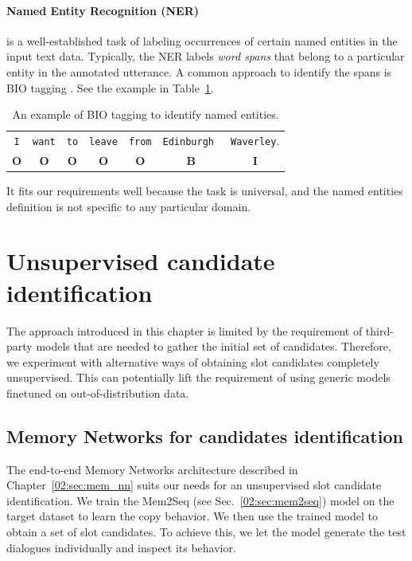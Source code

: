 \paragraph{Named Entity Recognition (NER)} is a well-established task of labeling occurrences of certain named entities in the input text data.
Typically, the NER labels \textit{word spans} that belong to a particular entity in the annotated utterance.
A common approach to identify the spans is BIO tagging \cite{ramshaw-marcus-1995-text}.
See the example in Table~\ref{04:tab:ner_example}.
\begin{table}[tp]
    \centering
    \begin{tabular}{c|c|c|c|c|c|c}
    \toprule
        \texttt{I} & \texttt{want} & \texttt{to} & \texttt{leave} & \texttt{from} & \texttt{{\color{cyan!80!yellow!80!black!100 }Edinburgh }} & \texttt{{\color{cyan!80!yellow!80!black!100 }Waverley}}. \\
        \textbf{O} & \textbf{O} & \textbf{O} & \textbf{O} & \textbf{O} & \textbf{B} & \textbf{I}\\
    \bottomrule
    \end{tabular}
    \label{04:tab:ner_example}
    \caption{An example of BIO tagging to identify named entities.}
\end{table}
It fits our requirements well because the task is universal, and the named entities definition is not specific to any particular domain.

\section{Unsupervised candidate identification}
\label{04:sec:unsup_candidate_selection}
The approach introduced in this chapter is limited by the requirement of third-party models that are needed to gather the initial set of candidates.
Therefore, we experiment with alternative ways of obtaining slot candidates completely unsupervised.
This can potentially lift the requirement of using generic models finetuned on out-of-distribution data.

\subsection{Memory Networks for candidates identification}
\label{04:sec:memnn}
The end-to-end Memory Networks architecture described in Chapter~\ref{02:sec:mem_nn} suits our needs for an unsupervised slot candidate identification.
We train the Mem2Seq (see Sec.~\ref{02:sec:mem2seq}) model on the target dataset to learn the copy behavior.
We then use the trained model to obtain a set of slot candidates.
To achieve this, we let the model generate the test dialogues individually and inspect its behavior.

